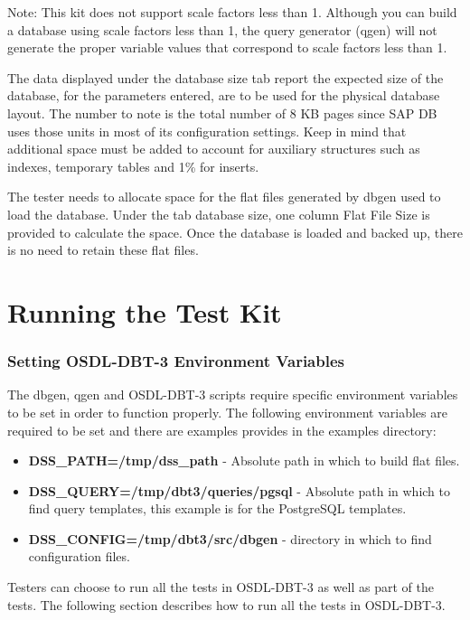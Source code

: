 \documentclass{article}
\begin{document}
Note:  This kit does not support scale factors less than 1.  Although you can
build a database using scale factors less than 1, the query generator (qgen)
will not generate the proper variable values that correspond to scale factors
less than 1.

The data displayed under the database size tab report the expected size of the
database, for the parameters entered, are to be used for the physical database
layout.  The number to note is the total number of 8 KB pages since SAP DB uses
those units in most of its configuration settings.  Keep in mind that
additional space must be added to account for auxiliary structures such as
indexes, temporary tables and 1\% for inserts.

The tester needs to allocate space for the flat files generated by dbgen used
to load the database.  Under the tab database size, one column Flat File Size
is provided to calculate the space.  Once the database is loaded and backed up,
there is no need to retain these flat files.

\section{Running the Test Kit}

\subsubsection{Setting OSDL-DBT-3 Environment Variables}

The dbgen, qgen and OSDL-DBT-3 scripts require specific environment variables
to be set in order to function properly.  The following environment variables
are required to be set and there are examples provides in the examples
directory:

\begin{itemize}
  \item \textbf{DSS\_PATH=/tmp/dss\_path} - Absolute path in which to build
        flat files.
  \item \textbf{DSS\_QUERY=/tmp/dbt3/queries/pgsql} - Absolute path in which to
        find query templates, this example is for the PostgreSQL templates.
  \item \textbf{DSS\_CONFIG=/tmp/dbt3/src/dbgen} - directory in which to find
        configuration files.
\end{itemize}

Testers can choose to run all the tests in OSDL-DBT-3 as well as part of the
tests.  The following section describes how to run all the tests in OSDL-DBT-3.
\end{document}
